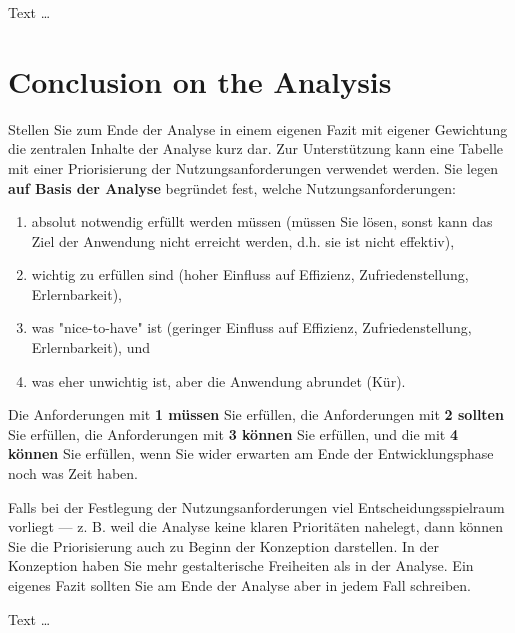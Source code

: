 \documentclass[11pt,a4paper,english]{scrreprt}
\newenvironment{comment}
  {\par\medskip
   \begingroup\color{olive}%
   }
 {\endgroup
  \medskip}
\begin{document}
Text \dots

\section{Conclusion on the Analysis}
\begin{comment}
Stellen Sie zum Ende der Analyse in einem eigenen Fazit mit eigener Gewichtung die zentralen Inhalte der Analyse kurz dar. Zur Unterstützung kann eine Tabelle mit einer Priorisierung der Nutzungsanforderungen verwendet werden. Sie legen \textbf{auf Basis der Analyse} begründet fest, welche Nutzungsanforderungen:

\begin{enumerate}
    \item absolut notwendig erfüllt werden müssen (müssen Sie lösen, sonst kann das Ziel der Anwendung nicht erreicht werden, d.h. sie ist nicht effektiv),
    \item wichtig zu erfüllen sind (hoher Einfluss auf Effizienz, Zufriedenstellung, Erlernbarkeit),
    \item was "nice-to-have" ist (geringer Einfluss auf Effizienz, Zufriedenstellung, Erlernbarkeit), und
    \item was eher unwichtig ist, aber die Anwendung abrundet (Kür).
\end{enumerate}

Die Anforderungen mit \textbf{1 müssen} Sie erfüllen, die Anforderungen mit \textbf{2 sollten} Sie erfüllen, die Anforderungen mit \textbf{3 können} Sie erfüllen, und die mit \textbf{4 können} Sie erfüllen, wenn Sie wider erwarten am Ende der Entwicklungsphase noch was Zeit haben.

Falls bei der Festlegung der Nutzungsanforderungen viel Entscheidungsspielraum vorliegt — z. B. weil die Analyse keine klaren Prioritäten nahelegt, dann können Sie die Priorisierung auch zu Beginn der Konzeption darstellen. In der Konzeption haben Sie mehr gestalterische Freiheiten als in der Analyse. Ein eigenes Fazit sollten Sie am Ende der Analyse aber in jedem Fall schreiben.
\end{comment}

Text \dots

\newpage
\end{document}
